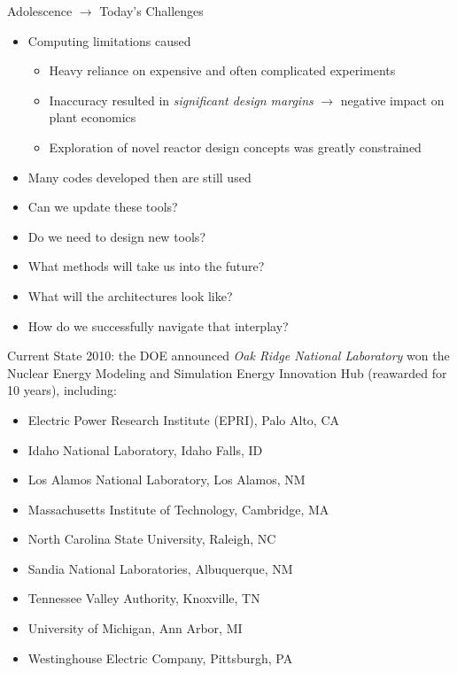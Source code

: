 \documentclass[xcolor=x11names,compress]{beamer}
\renewcommand{\(}{\begin{columns}}
\renewcommand{\)}{\end{columns}}
\newcommand{\<}[1]{\begin{column}{#1}}
\renewcommand{\>}{\end{column}}
\begin{document}
\begin{frame}{Adolescence $\rightarrow$ Today's Challenges}
\begin{itemize}
\item Computing limitations caused
\begin{itemize}
\item Heavy reliance on expensive and often complicated experiments
\item Inaccuracy resulted in \emph{significant design margins} $\rightarrow$ negative impact on plant economics
\item Exploration of novel reactor design concepts was greatly constrained 
\vspace*{1 em}
\end{itemize}
\item Many codes developed then are still used 
\pause
\item Can we update these tools?
\pause
\item Do we need to design new tools?
\pause
\item What methods will take us into the future?
\pause
\item What will the architectures look like?
\pause
\item How do we successfully navigate that interplay?
\end{itemize}
\end{frame}

\begin{frame}{Current State}
2010: the DOE announced \emph{Oak Ridge National Laboratory} won the Nuclear Energy Modeling and Simulation Energy Innovation Hub (reawarded for 10 years), including:	
\begin{itemize}
\item Electric Power Research Institute (EPRI), Palo Alto, CA
\item Idaho National Laboratory, Idaho Falls, ID
\item Los Alamos National Laboratory, Los Alamos, NM
\item Massachusetts Institute of Technology, Cambridge, MA
\item North Carolina State University, Raleigh, NC
\item Sandia National Laboratories, Albuquerque, NM
\item Tennessee Valley Authority, Knoxville, TN
\item University of Michigan, Ann Arbor, MI
\item Westinghouse Electric Company, Pittsburgh, PA
\end{itemize}
\end{frame}
\end{document}
